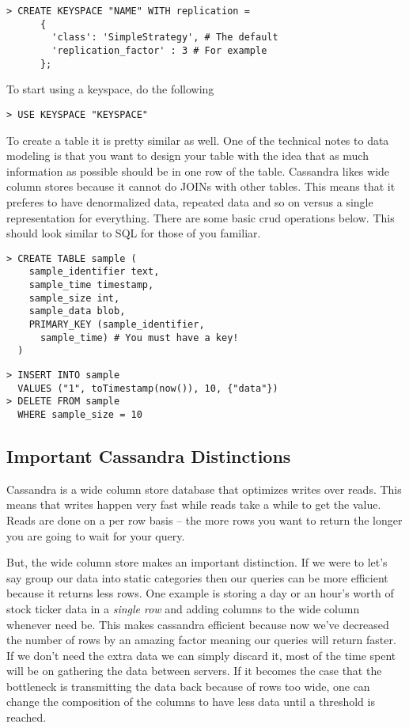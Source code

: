 \documentclass[9pt,twocolumn,twoside]{idsi}
\begin{document}
\begin{lstlisting}[breaklines]
> CREATE KEYSPACE "NAME" WITH replication = 
      {
        'class': 'SimpleStrategy', # The default 
        'replication_factor' : 3 # For example
      };
\end{lstlisting}

To start using a keyspace, do the following

\begin{lstlisting}[breaklines]
> USE KEYSPACE "KEYSPACE"
\end{lstlisting}

To create a table it is pretty similar as well. One of the technical notes to data modeling is that you want to design your table with the idea that as much information as possible should be in one row of the table. Cassandra likes wide column stores because it cannot do JOINs with other tables. This means that it preferes to have denormalized data, repeated data and so on versus a single representation for everything. There are some basic crud operations below. This should look similar to SQL for those of you familiar.

\begin{lstlisting}[breaklines]
> CREATE TABLE sample (
    sample_identifier text,
    sample_time timestamp,
    sample_size int,
    sample_data blob,
    PRIMARY_KEY (sample_identifier, 
      sample_time) # You must have a key!
  )
\end{lstlisting}

\begin{lstlisting}
> INSERT INTO sample 
  VALUES ("1", toTimestamp(now()), 10, {"data"})
> DELETE FROM sample 
  WHERE sample_size = 10
\end{lstlisting}

\subsection{Important Cassandra Distinctions}

Cassandra is a wide column store database that optimizes writes over reads. This means that writes happen very fast while reads take a while to get the value. Reads are done on a per row basis -- the more rows you want to return the longer you are going to wait for your query.

But, the wide column store makes an important distinction. If we were to let's say group our data into static categories then our queries can be more efficient because it returns less rows. One example is storing a day or an hour's worth of stock ticker data in a \textit{single row} and adding columns to the wide column whenever need be. This makes cassandra efficient because now we've decreased the number of rows by an amazing factor meaning our queries will return faster. If we don't need the extra data we can simply discard it, most of the time spent will be on gathering the data between servers. If it becomes the case that the bottleneck is transmitting the data back because of rows too wide, one can change the composition of the columns to have less data until a threshold is reached.
\end{document}
